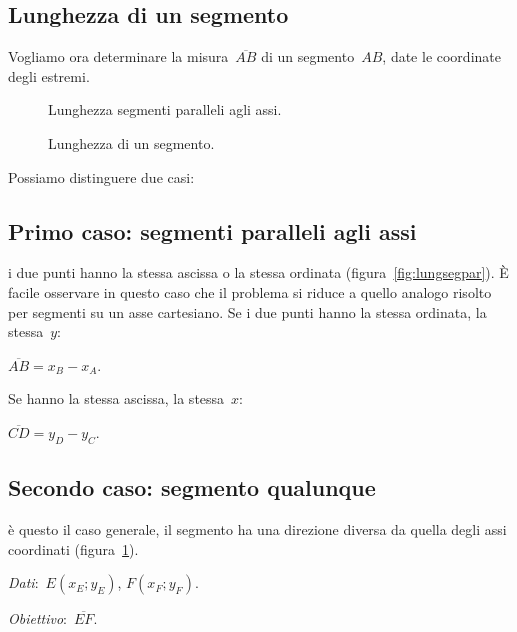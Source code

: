 \subsection{Lunghezza di un segmento}

Vogliamo ora determinare la misura~$\overline{AB}$ di un segmento~$AB$, 
date le coordinate degli estremi.

\begin{inaccessibleblock}
 \begin{figure}[h]
 \centering
 \begin{minipage}[t]{.45\textwidth}
  \centering \segmentiparalleli
  \caption{Lunghezza segmenti paralleli agli assi.}\label{fig:lungsegpar}
 \end{minipage}\hfil
 \begin{minipage}[t]{.45\textwidth}
  \centering \lungseg
  \caption{Lunghezza di un segmento.}\label{fig:lungseg}
 \end{minipage}\hfil
\end{figure}
\end{inaccessibleblock}

Possiamo distinguere due casi:

\subsection*{Primo caso: segmenti paralleli agli assi} i due punti hanno la 
stessa ascissa o la stessa ordinata (figura~\ref{fig:lungsegpar}). 
È facile osservare in questo caso che il problema si riduce a quello analogo
risolto per segmenti su un asse cartesiano. Se i due punti hanno la stessa 
ordinata, la stessa~$y$:

$\overline{AB} = x_B - x_A$.

Se hanno la stessa ascissa, la stessa~$x$:

$\overline{CD} = y_D - y_C$.

\subsection*{Secondo caso: segmento qualunque} è questo il caso generale, 
il segmento ha una 
direzione diversa da quella degli assi coordinati (figura~\ref{fig:lungseg}).

\emph{Dati}:~$E(x_E; y_E)$, $F(x_F;y_F)$.

\emph{Obiettivo}:~$\overline{EF}$.

